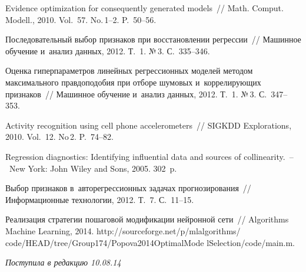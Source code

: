 \begin{multicols}{2}
{{\begin{thebibliography}{99}
 Evidence optimization for consequently
generated models~// Math.  Comput. Modell., 2010. Vol.~57. No.\,1--2. P.~50--56.

 Последовательный выбор признаков при восстановлении
регрессии~// Машинное обучение и~анализ данных, 2012. Т.~1. №\,3. С.~335--346.

 Оценка гиперпараметров
линейных регрессионных моделей методом максимального правдоподобия
при отборе шумовых и~коррелирующих признаков~// Машинное обучение
и~анализ данных, 2012. Т.~1. №\,3. С.~347--353.

 Activity recognition using cell
phone accelerometers~// SIGKDD Explorations, 2010. Vol.~12. No\,2. P.~74--82.

 Regression diagnostics:
Identifying influential data and sources of collinearity.~--~New York:
John Wiley and Sons, 2005. 302~p.

 Выбор признаков
в~авторегрессионных задачах прогнозирования~// Информационные технологии, 2012.
Т.~7. С.~11--15.

 Реализация стратегии пошаговой модификации нейронной сети~//
Algorithms Machine Learning, 2014.
{\sf http://sourceforge.net/p/mlalgorithms/
code/HEAD/tree/Group174/Popova2014OptimalMode lSelection/code/main.m}.
 \end{thebibliography}

 }
 }

\end{multicols}

\vspace*{-1pt}

\hfill{\small\textit{Поступила в редакцию 10.08.14}}

\newpage






